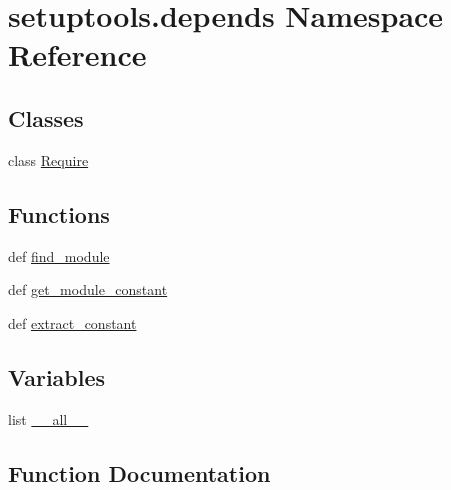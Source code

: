 \hypertarget{namespacesetuptools_1_1depends}{}\section{setuptools.\+depends Namespace Reference}
\label{namespacesetuptools_1_1depends}
\subsection*{Classes}
\begin{DoxyCompactItemize}
\item 
class \hyperlink{classsetuptools_1_1depends_1_1Require}{Require}
\end{DoxyCompactItemize}
\subsection*{Functions}
\begin{DoxyCompactItemize}
\item 
def \hyperlink{namespacesetuptools_1_1depends_ae751536d87e0ecb2cb830e47b0470e96}{find\+\_\+module}
\item 
def \hyperlink{namespacesetuptools_1_1depends_a8f18cb30241a6017d63d60c8faea6496}{get\+\_\+module\+\_\+constant}
\item 
def \hyperlink{namespacesetuptools_1_1depends_ae20f48f1174e65c91250afb8292c246d}{extract\+\_\+constant}
\end{DoxyCompactItemize}
\subsection*{Variables}
\begin{DoxyCompactItemize}
\item 
list \hyperlink{namespacesetuptools_1_1depends_a12fce1ae40d81e3952ed133393279752}{\+\_\+\+\_\+all\+\_\+\+\_\+}
\end{DoxyCompactItemize}


\subsection{Function Documentation}
\hypertarget{namespacesetuptools_1_1depends_ae20f48f1174e65c91250afb8292c246d}{}
